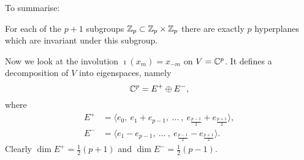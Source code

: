 To summarise:\\

\begin{prop}
	\label{invariant_hyperplanes}
	For each of the $p+1$ subgroups $\mathbb{Z}_{p} \subset \mathbb{Z}_{p} \times \mathbb{Z}_{p}$ there are exactly $p$ hyperplanes which are invariant under this subgroup.
\end{prop}

Now we look at the involution $\imath(x_{m}) = x_{-m}$ on $V = \mathbb{C}^{p}$. It defines a decomposition of $V$ into eigenspaces, namely
\begin{equation*}
	\mathbb{C}^{p} = E^{+} \oplus E^{-},
\end{equation*}
where
\begin{equation*}
	\begin{split}
	E^{+} &= \big\langle e_{0},\ e_{1} + e_{p-1},\ \ldots\ ,\ e_{\tfrac{p-1}{2}} + e_{\tfrac{p+1}{2}}\big\rangle,\\
	E^{-} &= \big\langle e_{1} - e_{p-1},\ \ldots\ ,\ e_{\tfrac{p-1}{2}} - e_{\tfrac{p+1}{2}}\big\rangle.
	\end{split}
\end{equation*}
Clearly $\dim E^{+} = \frac{1}{2}(p+1)$ and $\dim E^{-} = \frac{1}{2}(p-1)$.\\

